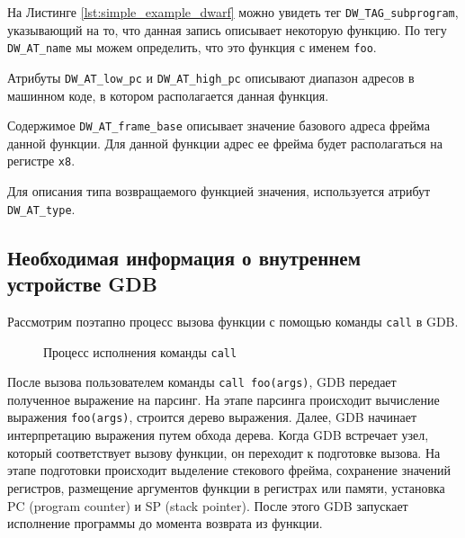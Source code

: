 На Листинге \ref{lst:simple_example_dwarf} можно увидеть тег \texttt{DW\_TAG\_subprogram},
указывающий на то, что данная запись описывает некоторую функцию. По тегу \texttt{DW\_AT\_name}
мы можем определить, что это функция с именем \texttt{foo}.

Атрибуты \texttt{DW\_AT\_low\_pc} и \texttt{DW\_AT\_high\_pc} описывают диапазон адресов в машинном
коде, в котором располагается данная функция.

Содержимое \texttt{DW\_AT\_frame\_base} описывает значение базового адреса фрейма данной
функции. Для данной функции адрес ее фрейма будет располагаться на регистре \texttt{x8}.

Для описания типа возвращаемого функцией значения, используется атрибут \texttt{DW\_AT\_type}.

\subsection {Необходимая информация о внутреннем устройстве GDB}
\label{gdb:internals}

Рассмотрим поэтапно процесс вызова функции с помощью команды \texttt{call} в GDB.

\begin{figure}[H]
\centering
{}
\caption{Процесс исполнения команды \texttt{call}}
\label{fig:gdb_pipeline}
\end{figure}

После вызова пользователем команды \texttt{call foo(args)}, GDB передает полученное выражение на парсинг.
На этапе парсинга происходит вычисление выражения \texttt{foo(args)}, строится дерево выражения.
Далее, GDB начинает интерпретацию выражения путем обхода дерева. Когда GDB встречает узел, который
соответствует вызову функции, он переходит к подготовке вызова. На этапе подготовки происходит
выделение стекового фрейма, сохранение значений регистров, размещение аргументов функции в регистрах или
памяти, установка PC (program counter) и SP (stack pointer). После этого GDB запускает исполнение
программы до момента возврата из функции.

